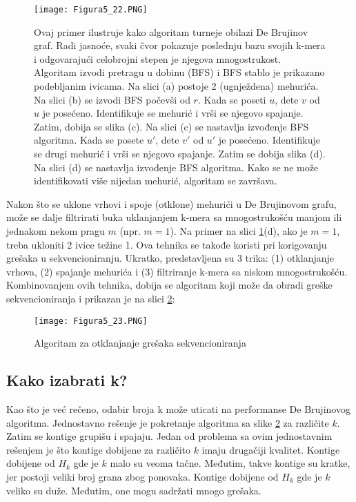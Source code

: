 \documentclass[12pt,oneside]{memoir}
\begin{document}
\newpage

\begin{figure}[!ht]
\centering
\texttt{[image: Figura5\_22.PNG]}
\caption{Ovaj primer ilustruje kako algoritam turneje obilazi De Brujinov graf. Radi jasnoće, svaki čvor pokazuje poslednju bazu svojih k-mera i odgovarajući celobrojni stepen je njegova mnogostrukost. Algoritam izvodi pretragu u dobinu (BFS) i BFS stablo je prikazano podebljanim ivicama. Na slici (a) postoje 2 (ugnježdena) mehurića. Na slici (b) se izvodi BFS počevši od $r$. Kada se poseti $u$, dete $v$ od $u$ je posećeno. Identifikuje se mehurić i vrši se njegovo spajanje. Zatim, dobija se slika (c). Na slici (c) se nastavlja izvođenje BFS algoritma. Kada se posete $u'$, dete $v'$ od $u'$ je posećeno. Identifikuje se drugi mehurić i vrši se njegovo spajanje. Zatim se dobija slika (d). Na slici (d) se nastavlja izvođenje BFS algoritma. Kako se ne može identifikovati više nijedan mehurić, algoritam se završava.}
\label{fig:15}
\end{figure}

Nakon što se uklone vrhovi i spoje (otklone) mehurići u De Brujinovom grafu, može se dalje filtrirati buka uklanjanjem k-mera sa mnogostrukošću manjom ili jednakom nekom pragu $m$ (npr. $m = 1$). Na primer na slici \ref{fig:15}(d), ako je $m = 1$, treba ukloniti 2 ivice težine 1. Ova tehnika se takođe koristi pri korigovanju grešaka u sekvencioniranju. Ukratko, predstavljena su 3 trika: (1) otklanjanje vrhova, (2) spajanje mehurića i (3) filtriranje k-mera sa niskom mnogostrukošću. Kombinovanjem ovih tehnika, dobija se algoritam koji može da obradi greške sekvencioniranja i prikazan je na slici \ref{fig:16}:

\begin{figure}[!ht]
\centering
\texttt{[image: Figura5\_23.PNG]}
\caption{Algoritam za otklanjanje grešaka sekvencioniranja}
\label{fig:16}
\end{figure}

\subsection{Kako izabrati k?}

Kao što je već rečeno, odabir broja k može uticati na performanse De Brujinovog algoritma. Jednostavno rešenje je pokretanje algoritma sa slike \ref{fig:16} za različite $k$. Zatim se kontige grupišu i spajaju. Jedan od problema sa ovim jednostavnim rešenjem je što kontige dobijene za različito $k$ imaju drugačiji kvalitet. Kontige dobijene od $H_k$ gde je $k$ malo su veoma tačne. Međutim, takve kontige su kratke, jer postoji veliki broj grana zbog ponovaka. Kontige dobijene od $H_k$ gde je $k$ veliko su duže. Međutim, one mogu sadržati mnogo grešaka.
\end{document}

